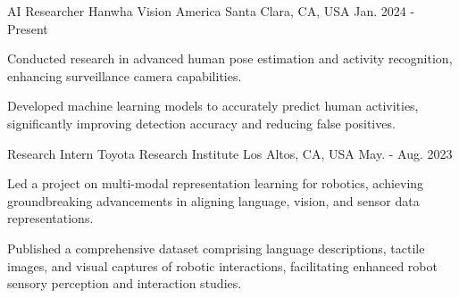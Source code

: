 


\begin{cventries}
\cventry
{AI Researcher} %
{Hanwha Vision America} %
{Santa Clara, CA, USA} %
{Jan. 2024 - Present} %
{ %
\begin{cvitems}
    \item Conducted research in advanced human pose estimation and activity recognition, enhancing surveillance camera capabilities.
    \item Developed machine learning models to accurately predict human activities, significantly improving detection accuracy and reducing false positives.
\end{cvitems}
}


\cventry
{Research Intern} %
{Toyota Research Institute} %
{Los Altos, CA, USA} %
{May. - Aug. 2023} %
{ %
\begin{cvitems}
    \item Led a project on multi-modal representation learning for robotics, achieving groundbreaking advancements in aligning language, vision, and sensor data representations.
    \item Published a comprehensive dataset comprising language descriptions, tactile images, and visual captures of robotic interactions, facilitating enhanced robot sensory perception and interaction studies.
\end{cvitems}
}


\end{cventries}
